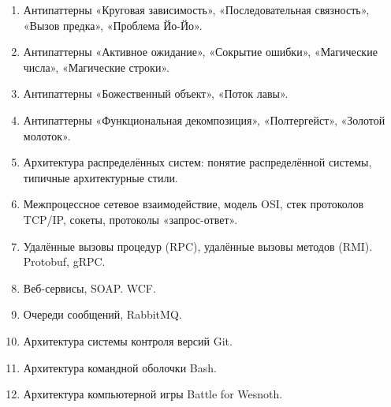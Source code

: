 \documentclass[a5paper]{article}
\begin{document}
\begin{enumerate}
    \item Антипаттерны «Круговая зависимость», «Последовательная связность», «Вызов предка», «Проблема Йо-Йо».
    \item Антипаттерны «Активное ожидание», «Сокрытие ошибки», «Магические числа», «Магические строки».
    \item Антипаттерны «Божественный объект», «Поток лавы».
    \item Антипаттерны «Функциональная декомпозиция», «Полтергейст», «Золотой молоток».
    \item Архитектура распределённых систем: понятие распределённой системы, типичные архитектурные стили.
    \item Межпроцессное сетевое взаимодействие, модель OSI, стек протоколов TCP/IP, сокеты, протоколы «запрос-ответ».
    \item Удалённые вызовы процедур (RPC), удалённые вызовы методов (RMI). Protobuf, gRPC.
    \item Веб-сервисы, SOAP. WCF.
    \item Очереди сообщений, RabbitMQ.
    \item Архитектура системы контроля версий Git.
    \item Архитектура командной оболочки Bash.
    \item Архитектура компьютерной игры Battle for Wesnoth.
\end{enumerate}
\end{document}
